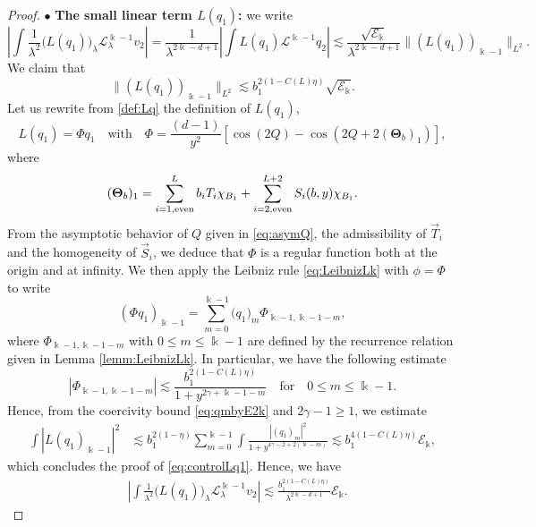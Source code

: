 \documentclass[11pt]{aims}
\theoremstyle{definition}
\numberwithin{equation}{section}
\begin{document}
\begin{proof}
\noindent $\bullet$ \textbf{The small linear term $L(q_1)$:} we write 
$$\left|\int \frac{1}{\lambda^2}\big(L(q_1)\big)_\lambda{\mathscr{L}}_\lambda^{\Bbbk - 1}v_2\right| = \frac{1}{\lambda^{2\Bbbk - d  +1}}\left|\int L(q_1){\mathscr{L}}^{\Bbbk - 1}q_2\right| \lesssim \frac{\sqrt{{\mathscr{E}}_\Bbbk}}{\lambda^{2\Bbbk -d + 1 }}\|(L(q_1))_{\Bbbk - 1} \|_{L^2}.$$
We claim that 
\begin{equation}\label{eq:controlLq1}
\|(L(q_1))_{\Bbbk - 1} \|_{L^2} \lesssim b_1^{2(1 - C(L)\eta)} \sqrt{{\mathscr{E}}_\Bbbk}.
\end{equation}
Let us rewrite from \eqref{def:Lq} the definition of $L(q_1)$, 
$$L(q_1) = \Phi q_1 \quad \text{with} \quad \Phi = \frac{(d-1)}{y^2}\left[\cos(2Q) - \cos(2Q + 2(\mathbf{\Theta}_b)_1)\right],$$
where 
$$(\mathbf{\Theta}_b)_1 = \sum_{i = 1, \textup{even}}^Lb_i T_i \chi_{B_1} + \sum_{i = 2, \textup{even}}^{L+2}S_i(b,y)\chi_{B_1}.$$
From the asymptotic behavior of $Q$ given in \eqref{eq:asymQ}, the admissibility of $\vec T_i$ and the homogeneity of $\vec S_i$, we deduce that $\Phi$ is a regular function both at the origin and at infinity. We then apply the Leibniz rule \eqref{eq:LeibnizLk} with  $\phi = \Phi$ to write 
$$(\Phi q_1)_{\Bbbk - 1} = \sum_{m = 0}^{\Bbbk - 1}\big(q_1 \big)_m\Phi_{\Bbbk - 1, \Bbbk - 1 - m},$$
where $\Phi_{\Bbbk - 1, \Bbbk - 1 -  m}$ with $0 \leq m \leq \Bbbk - 1$ are defined by the recurrence relation given in Lemma \ref{lemm:LeibnizLk}. In particular, we have the following estimate
$$|\Phi_{\Bbbk - 1, \Bbbk - 1 - m}| \lesssim \frac{b_1^{2(1 - C(L)\eta)}}{1 + y^{2\gamma + \Bbbk - 1 - m }} \quad \text{for}\quad 0 \leq m \leq \Bbbk - 1.$$
Hence, from  the coercivity bound \eqref{eq:qmbyE2k} and $2\gamma - 1 \geq 1$, we estimate
\begin{align*}
\int |L(q_1)_{\Bbbk - 1}|^2 &\lesssim b_1^{2(1 - \eta)}\sum_{m = 0}^{\Bbbk - 1}\int \frac{|(q_1)_m|^2}{1 + y^{4\gamma - 2 + 2(\Bbbk - m)}} \lesssim b_1^{4(1 - C(L)\eta)}{\mathscr{E}}_\Bbbk,
\end{align*}
which concludes the proof of \eqref{eq:controlLq1}. Hence, we have
\begin{align}
&\left|\int \frac{1}{\lambda^2}\big(L(q_1)\big)_\lambda{\mathscr{L}}_\lambda^{\Bbbk - 1}v_2\right| \lesssim \frac{b_1^{2(1 - C(L)\eta)}}{\lambda^{2\Bbbk - d + 1}}{\mathscr{E}}_\Bbbk. \label{est:Lq1}
\end{align}


\end{proof}
\end{document}
